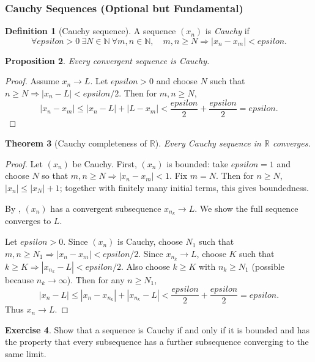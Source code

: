 \documentclass[12pt]{article}
\numberwithin{equation}{section}
\def\abs#1{|#1|}
\def\eps{epsilon}
\newcommand{\RR}{\mathbb{R}}
\newcommand{\NN}{\mathbb{N}}
\DeclarePairedDelimiter{\abs}{\lvert}{\rvert}
\newcommand{\eps}{\varepsilon}               %
\theoremstyle{plain}
\newtheorem{theorem}{Theorem}[section]
\newtheorem{proposition}[theorem]{Proposition}
\theoremstyle{definition}
\newtheorem{definition}[theorem]{Definition}
\newtheorem{exercise}[theorem]{Exercise}
\theoremstyle{remark}
\begin{document}
\subsubsection{Cauchy Sequences (Optional but Fundamental)}

\begin{definition}[Cauchy sequence]\label{def:cauchy}
A sequence $(x_n)$ is \emph{Cauchy} if
\[
\forall \eps>0\ \exists N\in\NN\ \forall m,n\in\NN,\quad m,n\ge N \Rightarrow \abs{x_n-x_m}<\eps.
\]
\end{definition}

\begin{proposition}\label{prop:conv-implies-cauchy}
Every convergent sequence is Cauchy.
\end{proposition}

\begin{proof}
Assume $x_n\to L$. Let $\eps>0$ and choose $N$ such that $n\ge N\Rightarrow \abs{x_n-L}<\eps/2$.
Then for $m,n\ge N$,
\[
\abs{x_n-x_m}\le \abs{x_n-L}+\abs{L-x_m}<\frac{\eps}{2}+\frac{\eps}{2}=\eps.
\]
\end{proof}

\begin{theorem}[Cauchy completeness of $\RR$]\label{thm:cauchy-complete}
Every Cauchy sequence in $\RR$ converges.
\end{theorem}

\begin{proof}
Let $(x_n)$ be Cauchy. First, $(x_n)$ is bounded: take $\eps=1$ and choose $N$ so that $m,n\ge N\Rightarrow \abs{x_n-x_m}<1$.
Fix $m=N$. Then for $n\ge N$, $\abs{x_n}\le \abs{x_N}+1$; together with finitely many initial terms, this gives boundedness.

By , $(x_n)$ has a convergent subsequence $x_{n_k}\to L$.
We show the full sequence converges to $L$.

Let $\eps>0$. Since $(x_n)$ is Cauchy, choose $N_1$ such that $m,n\ge N_1\Rightarrow \abs{x_n-x_m}<\eps/2$.
Since $x_{n_k}\to L$, choose $K$ such that $k\ge K\Rightarrow \abs{x_{n_k}-L}<\eps/2$.
Also choose $k\ge K$ with $n_k\ge N_1$ (possible because $n_k\to\infty$).
Then for any $n\ge N_1$,
\[
\abs{x_n-L}\le \abs{x_n-x_{n_k}}+\abs{x_{n_k}-L}<\frac{\eps}{2}+\frac{\eps}{2}=\eps.
\]
Thus $x_n\to L$.
\end{proof}

\begin{exercise}
Show that a sequence is Cauchy if and only if it is bounded and has the property that every subsequence has a further subsequence converging to the same limit.
\end{exercise}
\end{document}
